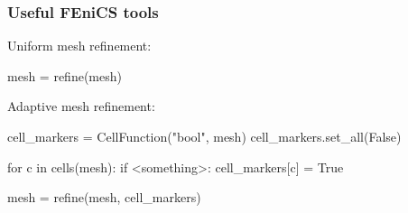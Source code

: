 \begin{frame}[fragile]
  \frametitle{Useful FEniCS tools}

  Uniform mesh refinement:
  \begin{python}
mesh = refine(mesh)
  \end{python}

  Adaptive mesh refinement:
  \begin{python}
cell_markers = CellFunction("bool", mesh)
cell_markers.set_all(False)

for c in cells(mesh):
    if <something>:
        cell_markers[c] = True

mesh = refine(mesh, cell_markers)
  \end{python}

\end{frame}
